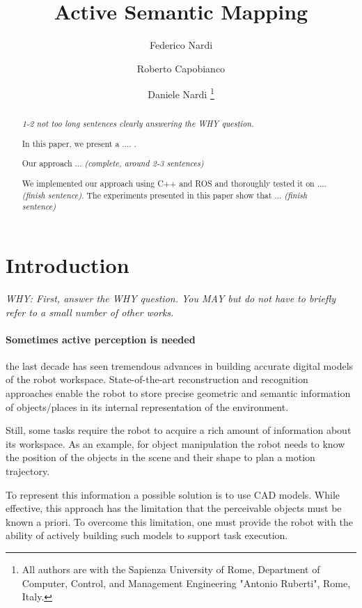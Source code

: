 \documentclass[letterpaper, 10 pt, conference]{ieeeconf}  %
\title{\LARGE \bf Active Semantic Mapping}
\author{Federico Nardi \and Roberto Capobianco \and Daniele Nardi%
	\thanks{All authors are with the Sapienza University of Rome, 
		Department of Computer, Control, and Management Engineering  "Antonio Ruberti", Rome, Italy. }%
}
\begin{document}
\maketitle
\thispagestyle{empty}
\pagestyle{empty}


\begin{abstract}
  \emph{1-2 not too long sentences clearly answering the WHY question.}
  
  In this paper, we present a ....  . 

  Our approach ... \emph{(complete, around 2-3 sentences)}
 
  We implemented our approach using C++ and ROS and thoroughly tested
  it on .... \emph{(finish sentence)}. The experiments presented in
  this paper show that ... \emph{(finish sentence)}
\end{abstract}


\section{Introduction}
\label{sec:intro}

{\color{blue}\emph{WHY: First, answer the WHY question. You MAY but do not have to
  briefly refer to a small number of other works.}}

\paragraph{Sometimes active perception is needed} the last decade has seen tremendous advances in building accurate digital models of the robot workspace. State-of-the-art reconstruction and recognition approaches enable the robot to store precise geometric and semantic information of objects/places in its internal representation of the environment.

Still, some tasks require the robot to acquire a rich amount of information about its workspace. As an example, for object manipulation the robot needs to know the position of the objects in the scene and their shape to plan a motion trajectory.

To represent this information a possible solution is to use CAD models. While effective, this approach has the limitation that the perceivable objects must be known a priori. To overcome this limitation, one must provide the robot with the ability of actively building such models to support task execution.
\end{document}
